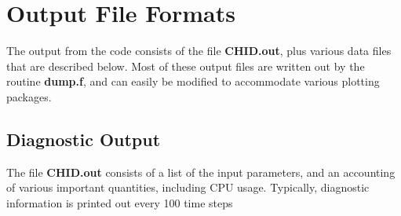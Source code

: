 \documentclass[11pt]{book}
\begin{document}
\chapter{Output File Formats}

The output from the code consists of the file {\bf CHID.out}, plus various
data files that are described below.
Most of these output files are written out by the routine {\bf dump.f},
and can easily be modified to accommodate various plotting packages.

\section{Diagnostic Output}%

\label{out:file}

The file {\bf CHID.out} consists of a list of the input
parameters, and an accounting of various important quantities, including
CPU usage. Typically, diagnostic information is printed out every
100 time steps
\end{document}

